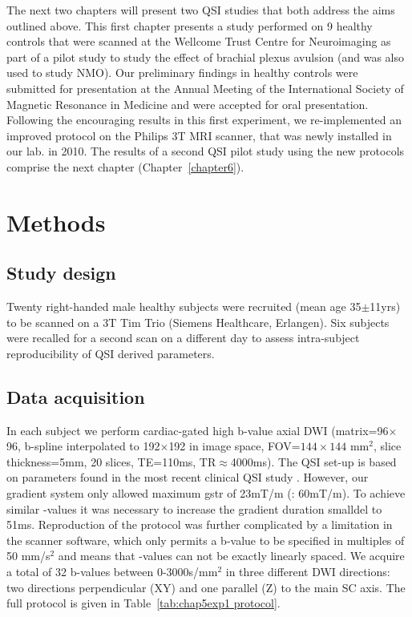 The next two chapters will present two \gls{QSI} studies that both address the aims outlined above. This first chapter presents a study performed on 9 healthy controls that were scanned at the Wellcome Trust Centre for Neuroimaging as part of a pilot study to study the effect of brachial plexus avulsion (and was also used to study \gls{NMO}). Our preliminary findings in healthy controls were submitted for presentation at the Annual Meeting of the International Society of Magnetic Resonance in Medicine and were accepted for oral presentation. Following the encouraging results in this first experiment, we re-implemented an improved protocol on the Philips 3T MRI scanner, that was newly installed in our lab. in 2010. The results of a second \gls{QSI} pilot study using the new protocols comprise the next chapter (Chapter~\ref{chapter6}).

\section{Methods}
\label{sec:chapter 5 exp1 methods}
\subsection{Study design}
Twenty right-handed male healthy subjects were recruited (mean age 35$\pm$11yrs) to be scanned on a 3T Tim Trio (Siemens Healthcare, Erlangen). Six subjects were recalled for a second scan on a different day to assess intra-subject reproducibility of \gls{QSI} derived parameters.

\subsection{Data acquisition}
In each subject we perform cardiac-gated high b-value axial {\gls{DWI}} (matrix=96$\times$96, b-spline interpolated to 192$\times$192 in image space, FOV=$144\times144$ mm$^2$, slice thickness=5mm, 20 slices, TE=110ms, TR$\approx$4000ms). The \gls{QSI} set-up is based on parameters found in the most recent clinical \gls{QSI} study \citep{Farrell:2008}. However, our gradient system only allowed maximum \gls{gstr} of 23mT/m (\citet{Farrell:2008}: 60mT/m). To achieve similar {\q}-values it was necessary to increase the gradient duration \gls{smalldel} to 51ms. Reproduction of the protocol was further complicated by a limitation in the scanner software, which only permits a b-value to be specified in multiples of 50 mm/s$^2$ and means that {\q}-values can not be exactly linearly spaced. We acquire a total of 32 b-values between 0-3000s/mm$^2$ in three different {\gls{DWI}} directions: two directions perpendicular (XY) and one parallel (Z) to the main {\gls{SC}} axis. The full protocol is given in Table~\ref{tab:chap5exp1 protocol}.

